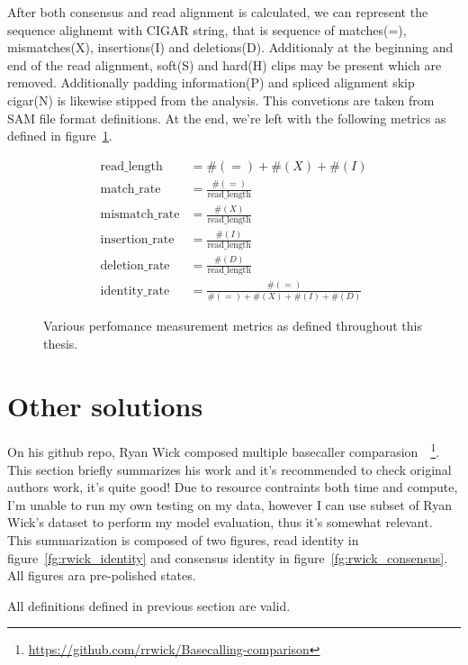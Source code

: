 \documentclass[times, utf8, diplomski, english]{fer}
\begin{document}
After both consensus and read alignment is calculated, we can represent the sequence alighnemt with CIGAR string, that is sequence of matches(=), mismatches(X), insertions(I) and deletions(D). Additionaly at the beginning and end of the read alignment, soft(S) and hard(H) clips may be present which are removed. Additionally padding information(P) and spliced alignment skip cigar(N) is likewise stipped from the analysis. This convetions are taken from SAM file format definitions. At the end, we're left with the following metrics as defined in figure~\ref{fg:metrics}.

\begin{figure}
\begin{align*}
 \text{read\_length} &= \#(=) + \#(X) + \#(I) \\ 
 \text{match\_rate} &= \frac{\#(=)}{\text{read\_length}} \\
 \text{mismatch\_rate} &= \frac{\#(X)}{\text{read\_length}} \\
 \text{insertion\_rate} &= \frac{\#(I)}{\text{read\_length}} \\
 \text{deletion\_rate} &= \frac{\#(D)}{\text{read\_length}} \\
 \text{identity\_rate} &= \frac{\#(=)}{\#(=) + \#(X) +\#(I) + \#(D)}  
\end{align*}
\label{fg:metrics}
\caption{Various perfomance measurement metrics as defined throughout this thesis.}
\end{figure}

\section{Other solutions}
On his github repo, Ryan Wick composed multiple basecaller comparasion~\citep{rwick_basecalling_cmp}~\footnote{\url{https://github.com/rrwick/Basecalling-comparison}}. This section briefly summarizes his work and it's recommended to check original authors work, it's quite good! Due to resource contraints both time and compute, I'm unable to run my own testing on  my data, however I can use subset of Ryan Wick's dataset to perform my model evaluation, thus it's somewhat relevant. This summarization is composed of two figures, read identity in figure~\ref{fg:rwick_identity} and consensus identity in figure~\ref{fg:rwick_consensus}. All figures ara pre-polished states.

All definitions defined in previous section are valid.
\end{document}
